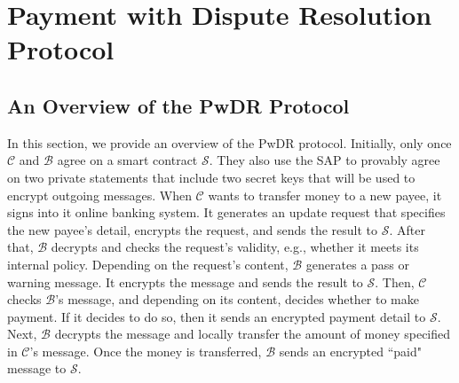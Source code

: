 







\section{Payment with Dispute Resolution Protocol}\label{sec::PwDR-Protocol}




\subsection{An Overview of  the PwDR Protocol}


In this section, we provide an overview of the  PwDR protocol. Initially, only  once    $\mathcal{C}$ and   $\mathcal{B}$   agree on a smart contract  $\mathcal{S}$. They also use the SAP to provably agree on two private statements that include two  secret keys that  will be used to encrypt outgoing messages. When $\mathcal{C}$ wants to transfer money to a new payee, it   signs into it online banking system.  It generates an update  request that specifies the new payee's detail,  encrypts the request, and sends the result to  $\mathcal{S}$. After that, $\mathcal{B}$ decrypts and checks the request's validity, e.g.,  whether it  meets its internal policy. Depending on the  request's content, $\mathcal{B}$ generates a pass or warning message. It encrypts the message and sends the result to $\mathcal{S}$. Then, $\mathcal{C}$ checks $\mathcal{B}$'s message, and depending on its content, decides whether  to   make  payment. If it decides to do so, then it sends an encrypted payment detail to $\mathcal{S}$. Next, $\mathcal{B}$  decrypts the message and locally transfer the amount of money specified in $\mathcal{C}$'s message. Once the money is transferred, $\mathcal{B}$ sends an encrypted  ``paid" message to $\mathcal{S}$. 


